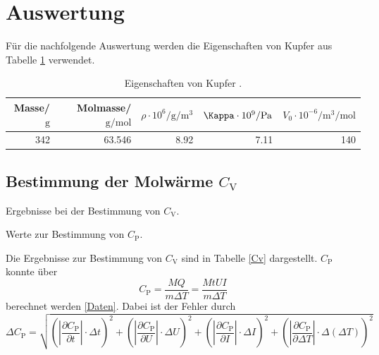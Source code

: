 \newpage
\section{Auswertung} %
\label{sec:auswertung}

Für die nachfolgende Auswertung werden die Eigenschaften von Kupfer aus Tabelle \ref{Eigenschaften} verwendet.

\begin{table}[!h]
	\centering
	\caption[]{Eigenschaften von Kupfer \cite{kupfer1}\cite{kupfer2}.}
	\begin{tabular}{rrrrr}
		\toprule
		Masse/$\si{\gram}$ & Molmasse/$\si{\gram\per\mol}$ & $\rho \cdot 10^6/\si{\gram\per\meter^3}$ & $\Kappa \cdot 10^9/\si{\pascal}$ & $V_0 \cdot 10^{-6}/\si{\meter^3\per\mol}$\\
		\midrule
		342 & 63.546 & 8.92 & 7.11 & 140\\
		\bottomrule
	\end{tabular}
	\label{Eigenschaften}
\end{table}

\FloatBarrier
\subsection{Bestimmung der Molwärme $C_\mathrm{V}$} %
\label{sub:bestimmung_von_c__mathrm}

\begin{table}[!h]
	\caption[]{Ergebnisse bei der Bestimmung von $C_\mathrm{V}$.}
	\centering
	
	\label{Cv}
\end{table}

\begin{table}[!h]
	\centering
	\caption[]{Werte zur Bestimmung von $C_\mathrm{P}$.}
	
	\label{Daten}
\end{table}

Die Ergebnisse zur Bestimmung von $C_\mathrm{V}$ sind in Tabelle \ref{Cv} dargestellt.
$C_\mathrm{P}$ konnte über
\begin{equation*}
	C_\mathrm{P} = \frac{M Q}{m \Delta T} = \frac{M t U I}{m \Delta T}
\end{equation*}
berechnet werden \ref{Daten}.
Dabei ist der Fehler durch
\begin{equation*}
	\Delta C_\mathrm{P} = \sqrt{\left(|\frac{\partial C_\mathrm{P}}{\partial t}|\cdot \Delta t \right)^2 + \left(|\frac{\partial C_\mathrm{P}}{\partial U}|\cdot \Delta U \right)^2 + \left(|\frac{\partial C_\mathrm{P}}{\partial I}|\cdot \Delta I \right)^2 + \left(|\frac{\partial C_\mathrm{P}}{\partial \Delta T}|\cdot \Delta (\Delta T) \right)^2}
\end{equation*}

